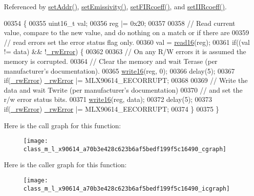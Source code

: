 Referenced by \mbox{\hyperlink{_m_l_x90614_8cpp_source_l00226}{set\+Addr()}}, \mbox{\hyperlink{_m_l_x90614_8cpp_source_l00107}{set\+Emissivity()}}, \mbox{\hyperlink{_m_l_x90614_8cpp_source_l00184}{set\+F\+I\+Rcoeff()}}, and \mbox{\hyperlink{_m_l_x90614_8cpp_source_l00143}{set\+I\+I\+Rcoeff()}}.


\begin{DoxyCode}
00354                                                      \{
00355     uint16\_t val;
00356     reg |= 0x20;
00357 
00358     \textcolor{comment}{// Read current value, compare to the new value, and do nothing on a match or if there are}
00359     \textcolor{comment}{// read errors set the error status flag only.}
00360     val = \mbox{\hyperlink{class_m_l_x90614_ad7fb030682918c5c9ae6292962527b44}{read16}}(reg);
00361     \textcolor{keywordflow}{if}((val != data) && !\mbox{\hyperlink{class_m_l_x90614_a8c203cc9359c283d07682ba7dbcc5de3}{\_rwError}}) \{
00362 
00363         \textcolor{comment}{// On any R/W errors it is assumed the memory is corrupted.}
00364         \textcolor{comment}{// Clear the memory and wait Terase (per manufacturer's documentation).}
00365         \mbox{\hyperlink{class_m_l_x90614_a18cf4b5a62e225e8530a1e0f641ea027}{write16}}(reg, 0);
00366         delay(5);
00367         \textcolor{keywordflow}{if}(\mbox{\hyperlink{class_m_l_x90614_a8c203cc9359c283d07682ba7dbcc5de3}{\_rwError}}) \mbox{\hyperlink{class_m_l_x90614_a8c203cc9359c283d07682ba7dbcc5de3}{\_rwError}} |= MLX90614\_EECORRUPT;
00368 
00369         \textcolor{comment}{// Write the data and wait Twrite (per manufacturer's documentation) }
00370         \textcolor{comment}{// and set the r/w error status bits.}
00371         \mbox{\hyperlink{class_m_l_x90614_a18cf4b5a62e225e8530a1e0f641ea027}{write16}}(reg, data); 
00372         delay(5);
00373         \textcolor{keywordflow}{if}(\mbox{\hyperlink{class_m_l_x90614_a8c203cc9359c283d07682ba7dbcc5de3}{\_rwError}}) \mbox{\hyperlink{class_m_l_x90614_a8c203cc9359c283d07682ba7dbcc5de3}{\_rwError}} |= MLX90614\_EECORRUPT;
00374     \}
00375 \}
\end{DoxyCode}
Here is the call graph for this function\+:\nopagebreak
\begin{figure}[H]
\begin{center}
\leavevmode
\texttt{[image: class\_m\_l\_x90614\_a70b3e428c623b6af5bedf199f5c16490\_cgraph]}
\end{center}
\end{figure}
Here is the caller graph for this function\+:\nopagebreak
\begin{figure}[H]
\begin{center}
\leavevmode
\texttt{[image: class\_m\_l\_x90614\_a70b3e428c623b6af5bedf199f5c16490\_icgraph]}
\end{center}
\end{figure}


